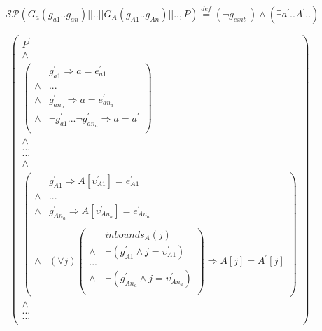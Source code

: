 \documentclass[a4paper,10pt]{article}
\newcommand{\p}[1]{\ensuremath{#1^{'}}\xspace}
\newcommand{\gexit}{\ensuremath{\mathit{g_{exit}~}}}
\newcommand{\inbounds}[2]{\ensuremath{\mathit{inbounds}_{#1}(#2)}\xspace}
\newcommand{\group}[2]{\ensuremath{\mathit{G}_{#1}(#2)}\xspace}
\newcommand{\symdef}{\ensuremath{\overset{\mathit{def}}{=}}}
\newcommand{\impl}{\ensuremath{\Longrightarrow}}
\newcommand{\spostsym}{\ensuremath{\mathcal{SP}}\xspace}
\newcommand{\spost}[2]{\ensuremath{\spostsym(#1,#2)}}
\begin{document}
\begin{eqnarray*}
    && \spost{\group{a}{g_{a1} .. g_{an}} || .. || \group{A}{g_{A1} .. g_{An}} || ..}{P} \symdef 
   (\neg \gexit) \land (\exists \p{a}..\p{A}..)\\
    &&~~~\\
    &&\begin{array}{cc}  
        \left(\begin{array}{cc}
                \p{P}\\
                \land\\                             
                \left(\begin{array}{cc}
                & \p{g_{a1}} \impl a = \p{e_{a1}} \\
                \land & ...\\
                \land & \p{g_{an_a}} \impl a = \p{e_{an_a}}\\
                \land & \neg \p{g_{a1}} ... \neg \p{g_{an_a}} \impl a = \p{a}\\
              \end{array}\right)\\
              \land\\
              ...\\
              ...\\
              \land\\ 
              \left(\begin{array}{cc}
                & \p{g_{A1}} \impl A[\p{\upsilon_{A1}}] = \p{e_{A1}} \\
                \land & ...\\
                \land & \p{g_{An_a}} \impl A[\p{\upsilon_{An_a}}] = \p{e_{An_a}}\\
                &~~~~~~~~~~~~~~~~\\
                \land & (\forall j)
              \left(\begin{array}{cc}
                &\inbounds{A}{j} \\
                \land & \neg (\p{g_{A1}} \land j =  \p{\upsilon_{A1}})\\
                ...\\
                \land & \neg (\p{g_{An_a}} \land j =  \p{\upsilon_{An_a}})\\
                \end{array}\right) \impl A[j] = \p{A}[j]
              \end{array}\right)\\   
              \land\\
              ...\\
              ...\\
        \end{array}\right)
    \end{array}
\end{eqnarray*}
\end{document}

